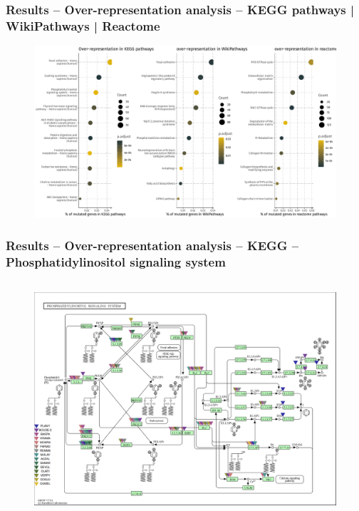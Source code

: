 \documentclass[aspectratio=169, 9pt]{beamer}
\begin{document}
\begin{frame}
    \frametitle{ Results -- Over-representation analysis -- KEGG pathways | WikiPathways | Reactome}
    \begin{figure}
        \includegraphics[width=.95\textwidth]{Images/enrich.pdf}
    \end{figure}
\end{frame}

\begin{frame}
    \frametitle{ Results -- Over-representation analysis -- KEGG -- Phosphatidylinositol signaling system}
    \begin{columns}[T]
        \begin{column}{.75\textwidth}
            \begin{figure}
                \includegraphics[height=.95\textheight]{Images/hsa04070.png}
            \end{figure}
        \end{column}
    \end{columns}
\end{frame}
\end{document}
